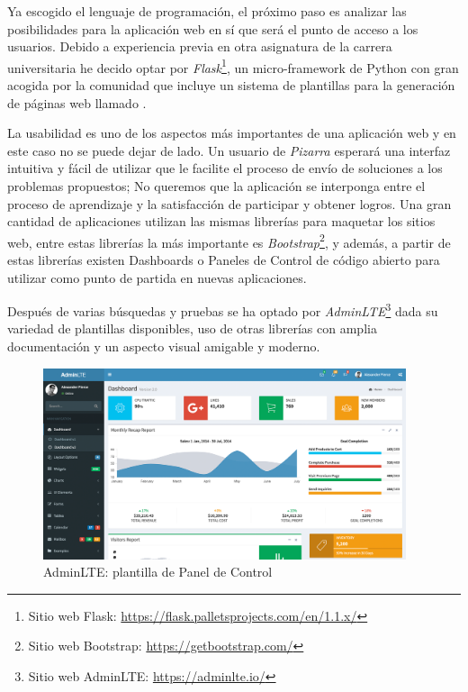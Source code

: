 \documentclass[11pt,spanish,listoffigures,listoftables]{tfgetsinf}
\begin{document}
Ya escogido el lenguaje de programación, el próximo paso es analizar las posibilidades para la aplicación web en sí que será el punto de acceso a los usuarios. Debido a experiencia previa en otra asignatura de la carrera universitaria he decido optar por \textit{Flask}\footnote{Sitio web Flask: \url{https://flask.palletsprojects.com/en/1.1.x/}}, un micro-framework de Python con gran acogida por la comunidad que incluye un sistema de plantillas para la generación de páginas web llamado . 

La usabilidad es uno de los aspectos más importantes de una aplicación web y en este caso no se puede dejar de lado. Un usuario de \textit{Pizarra} esperará una interfaz intuitiva y fácil de utilizar que le facilite el proceso de envío de soluciones a los problemas propuestos; No queremos que la aplicación se interponga entre el proceso de aprendizaje y la satisfacción de participar y obtener logros. Una gran cantidad de aplicaciones utilizan las mismas librerías para maquetar los sitios web, entre estas librerías la más importante es \textit{Bootstrap}\footnote{Sitio web Bootstrap: \url{https://getbootstrap.com/}}, y además, a partir de estas librerías existen Dashboards o Paneles de Control de código abierto para utilizar como punto de partida en nuevas aplicaciones.

Después de varias búsquedas y pruebas se ha optado por \textit{AdminLTE}\footnote{Sitio web AdminLTE: \url{https://adminlte.io/}} dada su variedad de plantillas disponibles, uso de otras librerías con amplia documentación y un aspecto visual amigable y moderno.

\begin{figure}[ht]
	\centering
	\includegraphics[width=0.95\textwidth]{img/admin-lte}
	\caption[AdminLTE: plantilla de Panel de Control ]{AdminLTE: plantilla de Panel de Control }
	\label{figura:admin-lte}
\end{figure}
\end{document}
